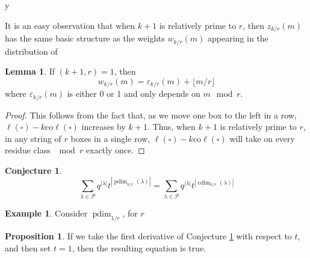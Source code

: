 y\documentclass{amsart}[12pt]
\theoremstyle{definition}
\newtheorem{lemma}[dummy]{Lemma}
\newtheorem{example}[dummy]{Example}
\newtheorem{proposition}[dummy]{Proposition}
\newtheorem{conjecture}[dummy]{Conjecture}
\newcommand{\PP}{\mathcal{P}} %
\newcommand{\coleg}{\text{co}\ell}
\DeclareMathOperator{\dusty}{pdim}
\DeclareMathOperator{\cdim}{cdim}
\begin{document}
It is an easy observation that when $k+1$ is relatively prime to $r$, then $z_{k/r}(m)$ has the same basic structure as the weights $w_{k/r}(m)$ appearing in the distribution of 

\begin{lemma} \label{lem:dusty-lemma}
If $(k+1,r)=1$, then 
$$w_{k/r}(m)=\varepsilon_{k/r}(m)+\lfloor m/r\rfloor$$
where $\varepsilon_{k/r}(m)$ is either 0 or 1 and only depends on $m\mod r$.
\end{lemma}

\begin{proof}
This follows from the fact that, as we move one box to the left in a row, $\ell(\square)-k\coleg(\square)$ increases by $k+1$.  Thus, when $k+1$ is relatively prime to $r$, in any string of $r$ boxes in a single row, $\ell(\square)-k\coleg(\square)$ will take on every residue class $\mod r$ exactly once. 
\end{proof}

\begin{conjecture} \label{conj:dusty}
$$\sum_{\lambda\in \PP} q^{|\lambda|} t^{|\dusty_{k/r}(\lambda)|}=\sum_{\lambda\in \PP} q^{|\lambda|} t^{|\cdim_{k/r}(\lambda)|}$$
\end{conjecture}


\begin{example}
Consider $\dusty_{1/r}$, for $r$ 

\end{example}


\begin{proposition}
If we take the first derivative of Conjecture \ref{conj:dusty} with respect to $t$, and then set $t=1$, then the resulting equation is true.  
\end{proposition}
\end{document}
